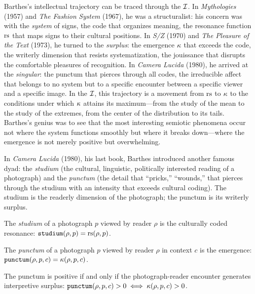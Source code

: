 \begin{remark}
Barthes's intellectual trajectory can be traced through the $\mathcal{I}$. In \textit{Mythologies} (1957) and \textit{The Fashion System} (1967), he was a structuralist: his concern was with the \emph{system} of signs, the code that organizes meaning, the resonance function $\mathrm{rs}$ that maps signs to their cultural positions. In \textit{S/Z} (1970) and \textit{The Pleasure of the Text} (1973), he turned to the \emph{surplus}: the emergence $\kappa$ that exceeds the code, the writerly dimension that resists systematization, the jouissance that disrupts the comfortable pleasures of recognition. In \textit{Camera Lucida} (1980), he arrived at the \emph{singular}: the punctum that pierces through all codes, the irreducible affect that belongs to no system but to a specific encounter between a specific viewer and a specific image. In the $\mathcal{I}$, this trajectory is a movement from $\mathrm{rs}$ to $\kappa$ to the conditions under which $\kappa$ attains its maximum---from the study of the mean to the study of the extremes, from the center of the distribution to its tails. Barthes's genius was to see that the most interesting semiotic phenomena occur not where the system functions smoothly but where it breaks down---where the emergence is not merely positive but overwhelming.
\end{remark}

In \textit{Camera Lucida} (1980), his last book, Barthes introduced
another famous dyad: the \emph{studium} (the cultural, linguistic,
politically interested reading of a photograph) and the \emph{punctum}
(the detail that ``pricks,'' ``wounds,'' that pierces through the
studium with an intensity that exceeds cultural coding). The studium
is the readerly dimension of the photograph; the punctum is its
writerly surplus.

\begin{definition}[Studium]
\label{def:studium}
The \emph{studium} of a photograph $p$ viewed by reader $\rho$ is the
culturally coded resonance:
$\texttt{studium}(\rho, p) = \mathrm{rs}(\rho, p)$.
\end{definition}

\begin{definition}[Punctum]
\label{def:punctum}
The \emph{punctum} of a photograph $p$ viewed by reader $\rho$ in
context $c$ is the emergence:
$\texttt{punctum}(\rho, p, c) = \kappa(\rho, p, c)$.
\end{definition}

\begin{theorem}
\label{thm:punctum-emergence}
The punctum is positive if and only if the photograph-reader encounter
generates interpretive surplus:
$\texttt{punctum}(\rho, p, c) > 0 \iff \kappa(\rho, p, c) > 0$.
\end{theorem}

